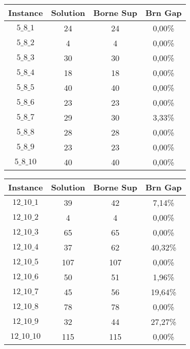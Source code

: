\documentclass[a4paper, 11pt]{article} %
\begin{document}
\begin{center}
\begin{figure}[H]
   \begin{minipage}[c]{.46\linewidth}
      \begin{tabular}{|c|c|c|c|}
      \hline 
        Instance & Solution & Borne Sup & Brn Gap  \\ \hline
$5\_8\_1$ & 24 &   24 &   0,00\% \\ \hline
$5\_8\_2$ & 4 &  4 &  0,00\% \\ \hline
$5\_8\_3$ & 30 &   30 &   0,00\% \\ \hline
$5\_8\_4$ & 18 &   18 &   0,00\% \\ \hline
$5\_8\_5$ & 40 &   40 &   0,00\% \\ \hline
$5\_8\_6$ & 23 &   23 &   0,00\% \\ \hline
$5\_8\_7$ & 29 &   30 &   3,33\% \\ \hline
$5\_8\_8$ & 28 &   28 &   0,00\% \\ \hline
$5\_8\_9$ & 23 &   23 &   0,00\% \\ \hline
$5\_8\_10$ &40 &   40 &   0,00\% \\ \hline
      \end{tabular}
   \end{minipage} \hfill
   \begin{minipage}[c]{.46\linewidth}
      \begin{tabular}{|c|c|c|c|}
      \hline 
        Instance & Solution & Borne Sup & Brn Gap  \\ \hline
$12\_10\_1$ & 39 &   42 &   7,14\% \\ \hline
$12\_10\_2$ & 4 &  4 &  0,00\% \\ \hline
$12\_10\_3$ & 65 &   65 &   0,00\% \\ \hline
$12\_10\_4$ & 37 &   62 &   40,32\% \\ \hline
$12\_10\_5$ & 107 &  107 &  0,00\% \\ \hline
$12\_10\_6$ & 50 &   51 &   1,96\% \\ \hline
$12\_10\_7$ & 45 &   56 &   19,64\% \\ \hline
$12\_10\_8$ & 78 &   78 &   0,00\% \\ \hline
$12\_10\_9$ & 32 &   44 &   27,27\% \\ \hline
$12\_10\_10$ &115 &  115 &  0,00\% \\ \hline
      \end{tabular}
   \end{minipage}
\end{figure}


\end{center}
\end{document}
